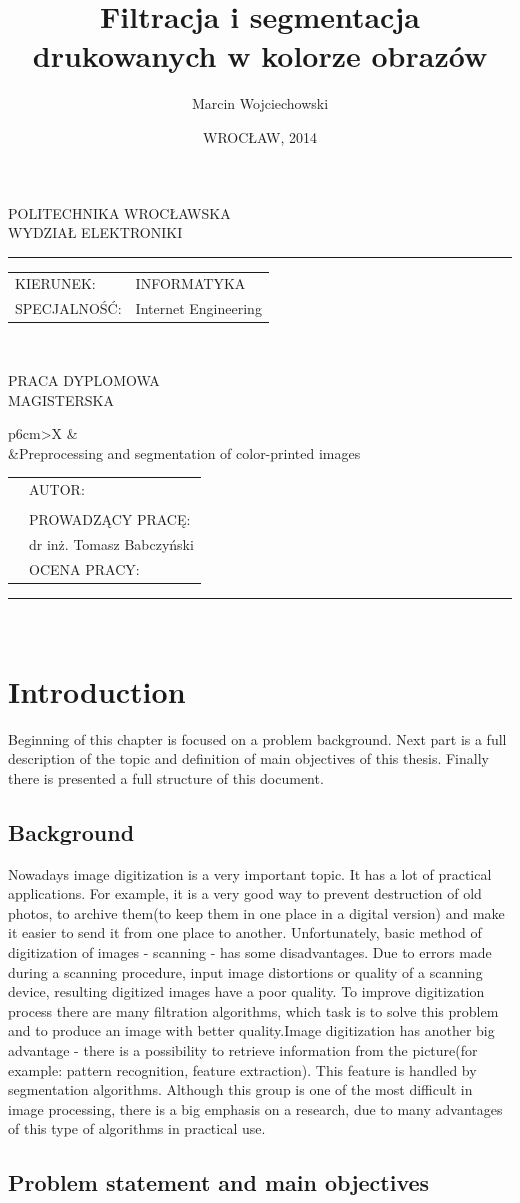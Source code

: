 \documentclass[a4paper,onecolumn,oneside,12pt]{memoir}
\makeatletter
\newcommand\uczelnia[1]{\renewcommand\@uczelnia{#1}}
\newcommand\@uczelnia{}
\newcommand\wydzial[1]{\renewcommand\@wydzial{#1}}
\newcommand\@wydzial{}
\newcommand\kierunek[1]{\renewcommand\@kierunek{#1}}
\newcommand\@kierunek{}
\newcommand\specjalnosc[1]{\renewcommand\@specjalnosc{#1}}
\newcommand\@specjalnosc{}
\newcommand\titleEN[1]{\renewcommand\@titleEN{#1}}
\newcommand\@titleEN{}
\newcommand\titleShort[1]{\renewcommand\@titleShort{#1}}
\newcommand\@titleShort{}
\newcommand\promotor[1]{\renewcommand\@promotor{#1}}
\newcommand\@promotor{}
\def\maketitle{%
  \null
  \pagestyle{empty}%
	{\centering\vspace{-1cm}
		{\fontsize{22pt}{24pt}\selectfont \@uczelnia}\\[0.4cm]
		{\fontsize{22pt}{24pt}\selectfont \@wydzial }\\[0.5cm]
		\hrule \vspace*{0.7cm}
	}
{\flushleft\fontsize{14pt}{16pt}\selectfont%
\begin{tabular}{ll}
KIERUNEK: & \@kierunek\\
SPECJALNOŚĆ: & \@specjalnosc\\
\end{tabular}\\[1.3cm]
}
{\centering
\vskip 1cm
{\fontsize{24pt}{26pt}\selectfont PRACA DYPLOMOWA}\\[0.5cm]
{\fontsize{24pt}{26pt}\selectfont MAGISTERSKA}\\[2cm]
\vskip 0.8cm
}
%
\begin{tabularx}{\linewidth}{p{6cm}>{\centering\arraybackslash}X}
		&{\fontsize{16pt}{18pt}\selectfont \@title}\\[5mm] 	%
		&{\fontsize{16pt}{18pt}\selectfont \@titleEN}\\[10mm] %
\end{tabularx}
\vfill
\begin{tabularx}{\linewidth}{p{6cm}l}
		&{\fontsize{16pt}{18pt}\selectfont AUTOR:}\\[5mm]
		&{\fontsize{14pt}{16pt}\selectfont \@author}\\[10mm]
		&{\fontsize{16pt}{18pt}\selectfont PROWADZĄCY PRACĘ:}\\[5mm]
		&{\fontsize{14pt}{16pt}\selectfont \@promotor}\\[10mm]
		&{\fontsize{16pt}{18pt}\selectfont OCENA PRACY:}\\[20mm]
	\end{tabularx}
\hrule\vspace*{0.3cm}
{\centering
{\fontsize{16pt}{18pt}\selectfont \@date}\\[0cm]
}
\normalfont
 \cleardoublepage
}
\makeatother
\begin{document}
\title{Filtracja i segmentacja drukowanych w kolorze obrazów}
\titleShort{Filtracja i segmentacja drukowanych w kolorze obrazów}
\titleEN{Preprocessing and segmentation of color-printed images}
\author{Marcin Wojciechowski}
\uczelnia{POLITECHNIKA WROCŁAWSKA}
\wydzial{WYDZIAŁ ELEKTRONIKI}
\kierunek{INFORMATYKA}
\specjalnosc{Internet Engineering}
\promotor{dr inż. Tomasz Babczyński}
\date{WROCŁAW, 2014}
\maketitle

\pagestyle{outer}
\mbox{}
\tableofcontents* 
\newpage

\chapter{Introduction}

Beginning of this chapter is focused on a problem background. Next part is a 
full description of the topic and definition of main objectives of this thesis.
Finally there is presented a full structure of this document.

\section{Background}

Nowadays image digitization is a very important topic. It has a lot of practical applications.
For example, it is a very good way to prevent destruction of old photos,
to archive them(to keep them in one place in a digital version) and make it easier to 
send it from one place to another. Unfortunately, basic method of digitization of
images - scanning - has some disadvantages. Due to errors made during a scanning procedure,
input image distortions or quality of a scanning device, resulting digitized images 
have a poor quality. To improve digitization process there are many filtration algorithms,
which task is to solve this problem and to produce an image with better quality.Image digitization 
has another big advantage - there is a possibility to retrieve information from the picture(for 
example: pattern recognition, feature extraction). This feature is handled by segmentation 
algorithms. Although this group is one of the most difficult in image processing, there is a big 
emphasis on a research, due to many advantages of this type of algorithms in practical use.

\section{Problem statement and main objectives}
\end{document}
